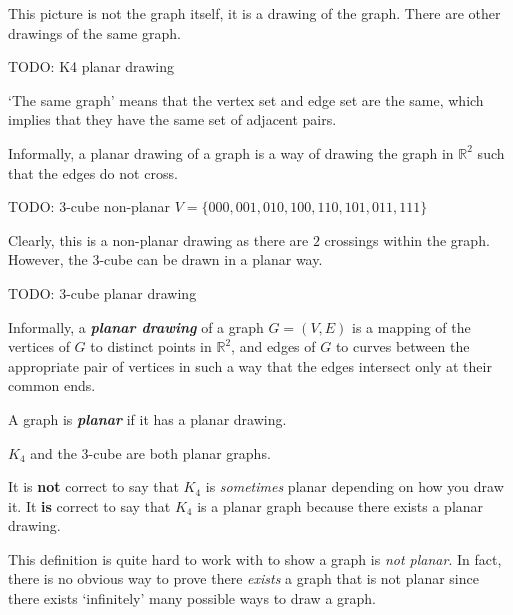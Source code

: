 This picture is not the graph itself, it is a drawing of the graph.
There are other drawings of the same graph.

TODO: K4 planar drawing

`The same graph' means that the vertex set and edge set are the same,
which implies that they have the same set of adjacent pairs.

Informally, a planar drawing of a graph is a way of drawing the graph
in $ \mathbb{R}^2 $ such that the edges do not cross.

TODO: 3-cube non-planar $ V=\{000,001,010,100,110,101,011,111\} $

Clearly, this is a non-planar drawing as there are $ 2 $ crossings
within the graph. However, the $ 3 $-cube can be drawn in a planar way.

TODO: 3-cube planar drawing

\begin{defbox}
    \begin{definition}
        Informally, a \textbf{\emph{planar drawing}} of a graph $ G=(V,E) $
        is a mapping of the vertices of $ G $ to distinct points in
        $ \mathbb{R}^{2} $, and edges of $ G $ to curves between the appropriate
        pair of vertices in such a way that the edges intersect only at their
        common ends.
    \end{definition}
\end{defbox}

\begin{defbox}
    \begin{definition}
        A graph is \textbf{\emph{planar}} if it has a planar drawing.
    \end{definition}
\end{defbox}

\begin{exbox}
    \begin{example}[Planar]
        $ K_4 $ and the $ 3 $-cube are both planar graphs.
        \begin{remark}
            It is \textbf{not} correct to say that $ K_4 $ is \emph{sometimes}
            planar depending on how you draw it. It \textbf{is} correct to say
            that $ K_4 $ is a planar graph because there exists a planar drawing.
        \end{remark}
    \end{example}
\end{exbox}

This definition is quite hard to work with to show a graph is
\emph{not planar}. In fact, there is no obvious way
to prove there \emph{exists} a graph that is not planar since there exists
`infinitely' many possible ways to draw a graph.

